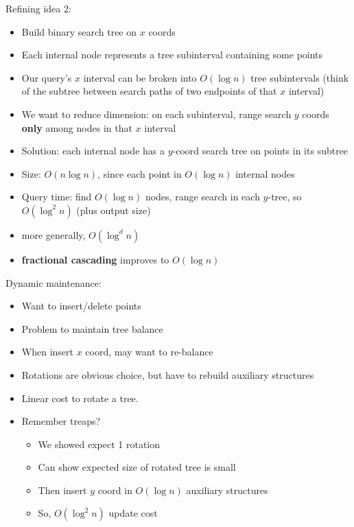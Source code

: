 \documentclass{article}
\begin{document}
Refining idea 2:
\begin{itemize}
\item Build binary search tree on $x$ coords
\item Each internal node represents a tree subinterval containing some points
\item Our query's $x$ interval can be broken into $O(\log n)$ tree
  subintervals (think of the subtree between search paths of two endpoints of that $x$ interval) 
\item We want to reduce dimension: on each subinterval, range search
  $y$ coords \textbf{ only} among nodes in that $x$ interval
\item Solution: each internal node has a $y$-coord search tree on
  points in its subtree
\item Size: $O(n\log n)$, since each point in $O(\log n)$ internal
  nodes
\item Query time: find $O(\log n)$ nodes, range search in each
  $y$-tree, so $O(\log^2 n)$ (plus output size)
\item more generally, $O(\log^d n)$
\item \textbf{ fractional cascading} improves to $O(\log n)$
\end{itemize}

Dynamic maintenance:
\begin{itemize}
\item Want to insert/delete points
\item Problem to maintain tree balance
\item When insert $x$ coord, may want to re-balance
\item Rotations are obvious choice, but have to rebuild auxiliary
  structures
\item Linear cost to rotate a tree.
\item Remember treaps?  
\begin{itemize}
\item We showed expect 1 rotation
\item Can show expected size of rotated tree is small
\item Then insert $y$ coord in $O(\log n)$ auxiliary structures
\item So, $O(\log^2 n)$ update cost
\end{itemize}
\end{itemize}

\newcommand{\indx}{\mathit{index}}

\end{document}
